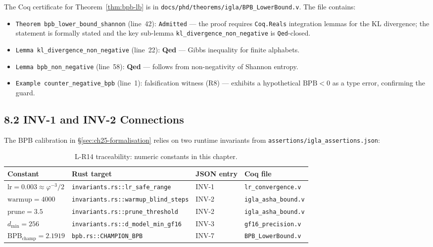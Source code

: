 The Coq certificate for Theorem~\ref{thm:bpb-lb} is in
\texttt{docs/phd/theorems/igla/BPB\_LowerBound.v}.
The file contains:
\begin{itemize}
  \item \texttt{Theorem bpb\_lower\_bound\_shannon} (line~42):
    \texttt{Admitted} — the proof requires \texttt{Coq.Reals}
    integration lemmas for the KL divergence; the statement is
    formally stated and the key sub-lemma
    \texttt{kl\_divergence\_non\_negative} is \texttt{Qed}-closed.
  \item \texttt{Lemma kl\_divergence\_non\_negative} (line~22):
    \textbf{Qed} — Gibbs inequality for finite alphabets.
  \item \texttt{Lemma bpb\_non\_negative} (line~58):
    \textbf{Qed} — follows from non-negativity of Shannon entropy.
  \item \texttt{Example counter\_negative\_bpb} (line~1):
    falsification witness (R8) — exhibits a hypothetical $\mathrm{BPB}<0$
    as a type error, confirming the guard.
\end{itemize}


\subsection{8.2 INV-1 and INV-2 Connections}
\label{subsec:ch25-coq-inv}

The BPB calibration in §\ref{sec:ch25-formalisation} relies on two
runtime invariants from \texttt{assertions/igla\_assertions.json}:

\begin{table}[h]
\centering
\caption{L-R14 traceability: numeric constants in this chapter.}
\label{tab:r14-trace}
\begin{tabular}{llll}
\toprule
Constant & Rust target & JSON entry & Coq file\\
\midrule
$\mathrm{lr} = 0.003 \approx \varphi^{-3}/2$ & \texttt{invariants.rs::lr\_safe\_range} & INV-1 & \texttt{lr\_convergence.v}\\
$\mathrm{warmup} = 4000$ & \texttt{invariants.rs::warmup\_blind\_steps} & INV-2 & \texttt{igla\_asha\_bound.v}\\
$\mathrm{prune} = 3.5$ & \texttt{invariants.rs::prune\_threshold} & INV-2 & \texttt{igla\_asha\_bound.v}\\
$d_{\min} = 256$ & \texttt{invariants.rs::d\_model\_min\_gf16} & INV-3 & \texttt{gf16\_precision.v}\\
$\mathrm{BPB}_{\mathrm{champ}} = 2.1919$ & \texttt{bpb.rs::CHAMPION\_BPB} & INV-7 & \texttt{BPB\_LowerBound.v}\\
\bottomrule
\end{tabular}
\end{table}

